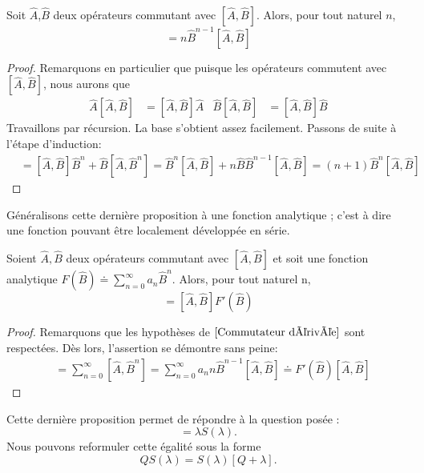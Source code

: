 \documentclass[../Notesdecours.tex]{subfiles}
\begin{document}
\begin{Property}
	\label{Commutateur dérivée}
	Soit $\hat{A}$,$\hat{B}$ deux opérateurs commutant avec $[\hat{A},\hat{B}]$. Alors, pour tout naturel $n$,
	\begin{equation}
		[\hat{A},\hat{B}^n] = n\hat{B}^{n-1}[\hat{A},\hat{B}]
	\end{equation}
\end{Property}
\begin{proof}
	Remarquons en particulier que puisque les opérateurs commutent avec $[\hat{A},\hat{B}]$, nous aurons que
	\begin{align}
		\hat{A}[\hat{A},\hat{B}] &= [\hat{A},\hat{B}]\hat{A} & \hat{B}[\hat{A},\hat{B}] &= [\hat{A},\hat{B}]\hat{B}
	\end{align}
	Travaillons par récursion. La base s'obtient assez facilement. Passons de suite à l'étape d'induction:
	\begin{align*}
		[\hat{A},\hat{B}\hat{B}^n] &= [\hat{A},\hat{B}]\hat{B}^n + \hat{B}[\hat{A},\hat{B}^n] = \hat{B}^n [\hat{A},\hat{B}] + n\hat{B}\hat{B}^{n-1}[\hat{A},\hat{B}] = \left(n+1\right)\hat{B}^n[\hat{A},\hat{B}]
	\end{align*}
\end{proof}
Généralisons cette dernière proposition à une fonction analytique ; c'est à dire une fonction pouvant être localement développée en série.
\begin{theorem}
\label{Lien commutateur dérivée}
	Soient $\hat{A},\hat{B}$ deux opérateurs commutant avec $[\hat{A},\hat{B}]$ et soit une fonction analytique $F(\hat{B}) \doteq \sum_{n = 0}^{\infty} a_n\hat{B}^n$. Alors, pour tout naturel n,
	\begin{equation}
		[\hat{A},F(\hat{B})] = [\hat{A},\hat{B}]F'(\hat{B})
	\end{equation}
\end{theorem}
\begin{proof}
	Remarquons que les hypothèses de $\ref{Commutateur dérivée}$ sont respectées. Dès lors, l'assertion se démontre sans peine:
	\begin{align*}
		[\hat{A},F(\hat{B})] &= \sum_{n = 0}^\infty [\hat{A},\hat{B}^n] = \sum_{n = 0}^\infty a_nn\hat{B}^{n-1} [\hat{A},\hat{B}] \doteq F'(\hat{B})[\hat{A},\hat{B}]
	\end{align*} 
\end{proof}

Cette dernière proposition permet de répondre à la question posée : 
\begin{equation}
	[X,S(\lambda)] = \lambda S(\lambda).	
\end{equation}
 Nous pouvons reformuler cette égalité sous la forme
\begin{equation}
	QS(\lambda) = S(\lambda)[Q+\lambda].
\end{equation}
\end{document}
